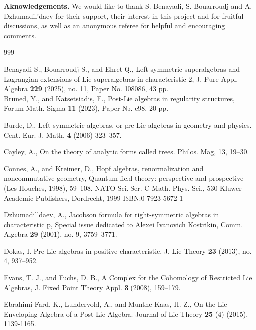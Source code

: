 \documentclass[12pt]{article}
\begin{document}




\noindent\textbf{Aknowledgements.} We would like to thank S. Benayadi, S. Bouarroudj and A. Dzhumadil'daev for their support, their interest in this project and for fruitful discussions, as well as an anonymous referee for helpful and encouraging comments.

\begin{thebibliography}{999}


  Benayadi S., Bouarroudj S., and Ehret Q., Left-symmetric superalgebras and Lagrangian extensions of Lie superalgebras in characteristic 2, J. Pure Appl. Algebra \textbf{229} (2025), no. 11, Paper No. 108086, 43 pp.\\

   Bruned, Y., and Katsetsiadis, F.,
Post-Lie algebras in regularity structures,
Forum Math. Sigma \textbf{11} (2023), Paper No. e98, 20 pp.

  Burde, D., Left-symmetric algebras, or pre-Lie algebras in geometry and physics. Cent. Eur. J.
Math. \textbf{4} (2006) 323–357.

Cayley, A., On the theory of analytic forms called trees. Philos. Mag, 13, 19--30.


 Connes, A., and Kreimer, D.,
Hopf algebras, renormalization and noncommutative geometry, Quantum field theory: perspective and prospective (Les Houches, 1998), 59–108.
NATO Sci. Ser. C Math. Phys. Sci., 530
Kluwer Academic Publishers, Dordrecht, 1999
ISBN:0-7923-5672-1

 Dzhumadil'daev, A.,
Jacobson formula for right-symmetric algebras in characteristic p,
Special issue dedicated to Alexei Ivanovich Kostrikin,
Comm. Algebra \textbf{29} (2001), no. 9, 3759--3771.

 Dokas, I.
Pre-Lie algebras in positive characteristic,
J. Lie Theory \textbf{23} (2013), no. 4, 937--952.



 Evans, T. J., and Fuchs, D. B., A Complex for the Cohomology of Restricted Lie Algebras, J. Fixed Point Theory Appl. {\bf 3} (2008), 159--179.

Ebrahimi-Fard, K., Lundervold, A., and Munthe-Kaas, H. Z., On the Lie Enveloping Algebra of a Post-Lie Algebra. Journal of Lie Theory \textbf{25} (4) (2015), 1139-1165.



\end{thebibliography}
\end{document}
